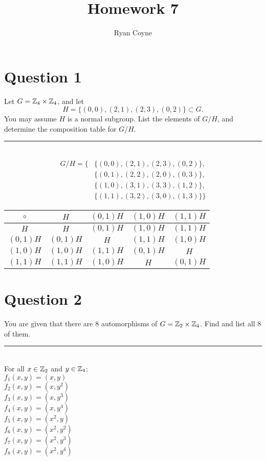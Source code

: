 \documentclass[12pt]{article}
\title{Homework 7}
\author{Ryan Coyne}
\def\bar{\rule{\linewidth}{0.4pt}}
\begin{document}
\maketitle

\section*{Question 1}
Let \(G = \mathbb{Z}_4\times \mathbb{Z}_4\), and let 
\begin{equation*}
    H = \{(0,0), (2,1), (2,3), (0,2)\}\subset G.
\end{equation*}
You may assume \(H\) is a normal subgroup. List the elements of \(G/H\), and determine the composition table for \(G/H\).\\
\bar\\
\begin{equation*}
    \begin{split}
        G/H = \{ &\{(0,0), (2,1), (2,3), (0,2)\}, \\
        &\{(0,1), (2,2), (2,0), (0,3)\},\\
        &\{(1,0), (3,1), (3,3), (1,2)\},\\
        &\{(1,1), (3,2), (3,0), (1,3)\} \}
    \end{split}
\end{equation*}
\begin{table}[H]
    \centering
    \begin{tabular}{c|cccc}
        \(\circ\) & \(H\) & \((0,1)H\) & \((1,0)H\) & \((1,1)H\)\\
        \hline
        \(H\) & \(H\) & \((0,1)H\) & \((1,0)H\) & \((1,1)H\)\\
        \((0,1)H\) & \((0,1)H\) & \(H\) & \((1,1)H\) & \((1,0)H\)\\
        \((1,0)H\) & \((1,0)H\) & \((1,1)H\) & \((0,1)H\) & \(H\)\\
        \((1,1)H\) & \((1,1)H\) & \((1,0)H\) & \(H\) & \((0,1)H\)
    \end{tabular}
\end{table}

\section*{Question 2}
You are given that there are 8 automorphisms of \(G = \mathbb{Z}_2 \times \mathbb{Z}_4\). Find and list all 8 of them. \\
\bar\\
For all \(x\in \mathbb{Z}_2\) and \(y\in \mathbb{Z}_4\):\\
\(f_1(x,y) = (x,y)\)\\
\(f_2(x,y) = (x,y^2)\)\\
\(f_3(x,y) = (x,y^3)\)\\
\(f_4(x,y) = (x,y^4)\)\\
\(f_5(x,y) = (x^2,y)\)\\
\(f_6(x,y) = (x^2,y^2)\)\\
\(f_7(x,y) = (x^2,y^3)\)\\
\(f_8(x,y) = (x^2,y^4)\)
\end{document}

